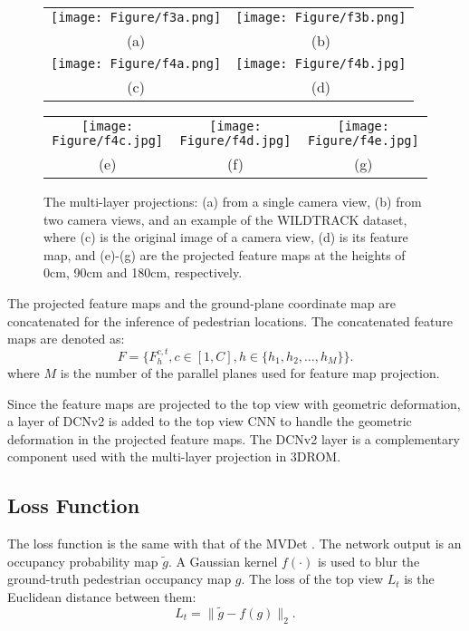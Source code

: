 \documentclass[runningheads]{llncs}
\begin{document}
	\begin{figure}[t]
		\begin{center}
			\begin{tabular}{cc}
				\texttt{[image: Figure/f3a.png]}&
				\texttt{[image: Figure/f3b.png]}\\
				(a) & (b)\\
				\texttt{[image: Figure/f4a.png]}&
				\texttt{[image: Figure/f4b.jpg]} \\
				(c) & (d)\\
			\end{tabular}
			
			\begin{tabular}{ccc}
				\texttt{[image: Figure/f4c.jpg]} &
				\texttt{[image: Figure/f4d.jpg]} &
				\texttt{[image: Figure/f4e.jpg]} \\
				(e)&(f)&(g)\\
			\end{tabular}
			\caption{The multi-layer projections: (a) from a single camera view, (b) from two camera views, and an example of the WILDTRACK dataset, where (c) is the original image of a camera view, (d) is its feature map, and (e)-(g) are the projected feature maps at the heights of 0cm, 90cm and 180cm, respectively.
			}
			\label{f4}
		\end{center}
	\end{figure}
	
	
	The projected feature maps and the ground-plane coordinate map are concatenated for the inference of pedestrian locations. The concatenated feature maps are denoted as:
	\begin{equation}
		F = \{F_h^{c,t}, c \in[1,C], h\in\{h_1, h_2,\dots, h_M \} \}.
	\end{equation}
	where $M$ is the number of the parallel planes used for feature map projection.
	
	Since the feature maps are projected to the top view with geometric deformation, a layer of DCNv2 \cite{zhu2019deformable} is added to the top view CNN to handle the geometric deformation in the projected feature maps. The DCNv2 layer is a complementary component used with the multi-layer projection in 3DROM.
	
	
	
	\subsection{Loss Function}
	The loss function is the same with that of the MVDet \cite{hou2020multiview}. The network output is an occupancy probability map $\tilde{g}$. A Gaussian kernel $f(\cdot)$ is used to blur the ground-truth  pedestrian occupancy map $g$. The loss of the top view $L_t$ is the Euclidean distance between them:
	\begin{equation}
		L_t = \| \tilde{g} - f(g) \|_2.
	\end{equation}
	
\end{document}
